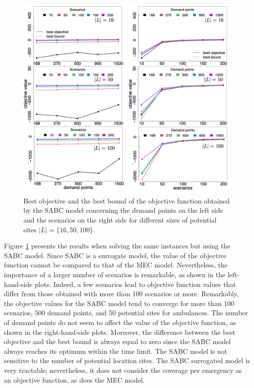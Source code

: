\begin{figure}[htb]
    \centering
    \includegraphics[width=.9\linewidth]{figures/M2objectiveValue.png}
    \caption{Best objective and the best bound of the objective function obtained by the SABC model concerning the demand points on the left side and the scenarios on the right side for different sizes of potential sites $|L|=\{16,50,100\}$.}
    \label{fig:M2objV}
\end{figure}
Figure \ref{fig:M2objV} presents the results when solving the same instances but using the SABC model. Since SABC is a surrogate model, the value of the objective function cannot be compared to that of the MEC model. Nevertheless, the importance of a larger number of scenarios is remarkable, as shown in the left-hand-side plots. Indeed, a few scenarios lead to objective function values that differ from those obtained with more than 100 scenarios or more. Remarkably, the objective values for the SABC model tend to converge for more than 100 scenarios, 500 demand points, and 50 potential sites for ambulances. The number of demand points do not seem to affect the value of the objective function, as shown in the right-hand-side plots. Moreover, the difference between the best objective and the best bound is always equal to zero since the SABC model always reaches its optimum within the time limit. The SABC model is not sensitive to the number of potential location sites. The SABC surrogated model is very tractable; nevertheless, it does not consider the coverage per emergency as an objective function, as does the MEC model.

